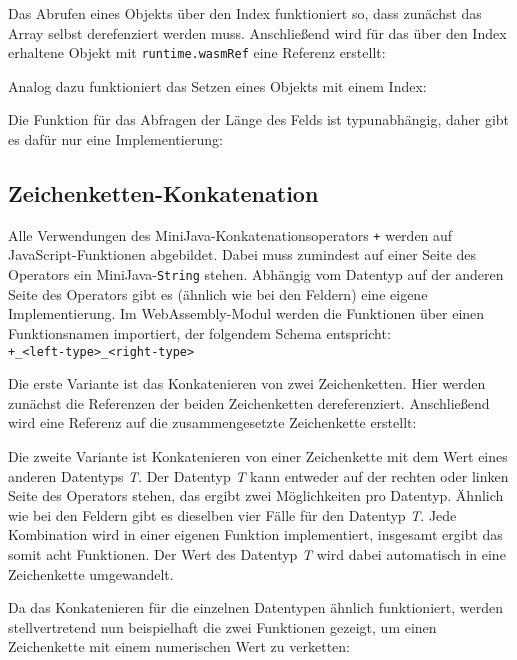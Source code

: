 Das Abrufen eines Objekts über den Index funktioniert so, dass zunächst das Array selbst derefenziert werden muss. Anschließend wird für das über den Index erhaltene Objekt mit \lstinline{runtime.wasmRef} eine Referenz erstellt:


Analog dazu funktioniert das Setzen eines Objekts mit einem Index:


Die Funktion für das Abfragen der Länge des Felds ist typunabhängig, daher gibt es dafür nur eine Implementierung:



\subsection{Zeichenketten-Konkatenation}

Alle Verwendungen des MiniJava-Konkatenationsoperators \lstinline{+} werden auf JavaScript-Funktionen abgebildet. Dabei muss zumindest auf einer Seite des Operators ein Mi\-ni\-Ja\-va-\lstinline{String} stehen. Abhängig vom Datentyp auf der anderen Seite des Operators gibt es (ähnlich wie bei den Feldern) eine eigene Implementierung. Im WebAssembly-Modul werden die Funktionen über einen Funktionsnamen importiert, der folgendem Schema entspricht: \\
\lstinline{+_<left-type>_<right-type>}

Die erste Variante ist das Konkatenieren von zwei Zeichenketten. Hier werden zunächst die Referenzen der beiden Zeichenketten dereferenziert. Anschließend wird eine Referenz auf die zusammengesetzte Zeichenkette erstellt:


Die zweite Variante ist Konkatenieren von einer Zeichenkette mit dem Wert eines anderen Datentyps \emph{T}. Der Datentyp \emph{T} kann entweder auf der rechten oder linken Seite des Operators stehen, das ergibt zwei Möglichkeiten pro Datentyp. Ähnlich wie bei den Feldern gibt es dieselben vier Fälle für den Datentyp \emph{T}. Jede Kombination wird in einer eigenen Funktion implementiert, insgesamt ergibt das somit acht Funktionen. Der Wert des Datentyp \emph{T} wird dabei automatisch in eine Zeichenkette umgewandelt.

Da das Konkatenieren für die einzelnen Datentypen ähnlich funktioniert, werden stellvertretend nun beispielhaft die zwei Funktionen gezeigt, um einen Zeichenkette mit einem numerischen Wert zu verketten:


